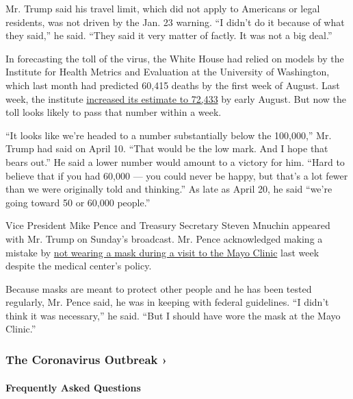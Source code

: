 Mr. Trump said his travel limit, which did not apply to Americans or
legal residents, was not driven by the Jan. 23 warning. ``I didn't do it
because of what they said,'' he said. ``They said it very matter of
factly. It was not a big deal.''

In forecasting the toll of the virus, the White House had relied on
models by the Institute for Health Metrics and Evaluation at the
University of Washington, which last month had predicted 60,415 deaths
by the first week of August. Last week, the institute
\href{https://covid19.healthdata.org/united-states-of-america}{increased
its estimate to 72,433} by early August. But now the toll looks likely
to pass that number within a week.

``It looks like we're headed to a number substantially below the
100,000,'' Mr. Trump had said on April 10. ``That would be the low mark.
And I hope that bears out.'' He said a lower number would amount to a
victory for him. ``Hard to believe that if you had 60,000 --- you could
never be happy, but that's a lot fewer than we were originally told and
thinking.'' As late as April 20, he said ``we're going toward 50 or
60,000 people.''

Vice President Mike Pence and Treasury Secretary Steven Mnuchin appeared
with Mr. Trump on Sunday's broadcast. Mr. Pence acknowledged making a
mistake by
\href{https://www.nytimes.com/2020/04/28/us/politics/coronavirus-pence-mask.html}{not
wearing a mask during a visit to the Mayo Clinic} last week despite the
medical center's policy.

Because masks are meant to protect other people and he has been tested
regularly, Mr. Pence said, he was in keeping with federal guidelines.
``I didn't think it was necessary,'' he said. ``But I should have wore
the mask at the Mayo Clinic.''

\href{https://www.nytimes.com/news-event/coronavirus?action=click\&pgtype=Article\&state=default\&region=MAIN_CONTENT_3\&context=storylines_faq}{}

\hypertarget{the-coronavirus-outbreak-}{%
\subsubsection{The Coronavirus Outbreak
›}\label{the-coronavirus-outbreak-}}

\hypertarget{frequently-asked-questions}{%
\paragraph{Frequently Asked
Questions}\label{frequently-asked-questions}}

